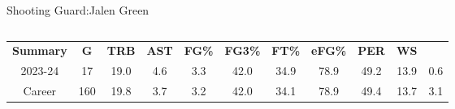 \begin{frame}{Shooting Guard:Jalen Green}
    \pause
    \begin{columns}
        \begin{column}{0.4\textwidth}
            \begin{table}[h]
                \small
                \centering
                \begin{tabular}{ c|cccc|cccc|cc }
                    \textbf{Summary} & \textbf{G} &\textbf{TRB} &\textbf{AST} & \textbf{FG\%} & \textbf{FG3\%} &\textbf{FT\%} &\textbf{eFG\%} & \textbf{PER} & \textbf{WS} \\
                    2023-24 & 17 & 19.0 & 4.6 & 3.3 & 42.0 & 34.9 & 78.9 & 49.2 & 13.9 & 0.6 \\
                    \pause
                    Career & 160 & 19.8 & 3.7 & 3.2 & 42.0 & 34.1 & 78.9 & 49.4 & 13.7 & 3.1 \\
                \end{tabular}
                \label{fig:player-statistics}
            \end{table}
        \end{column}
        \begin{column}{0.3\textwidth}
            \begin{figure}[t]
                \vspace{-14em}
                \label{fig:Jalen-Green}
            \end{figure}
        \end{column}
    \end{columns}
\end{frame}

